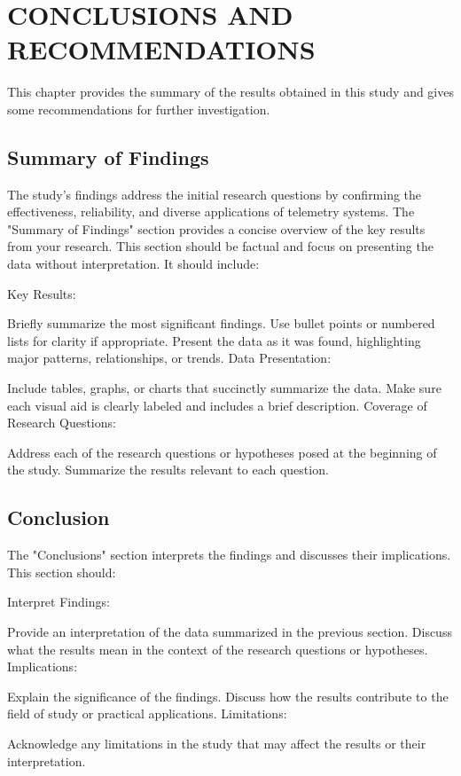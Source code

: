 \chapter{CONCLUSIONS AND RECOMMENDATIONS}
{\baselineskip

This chapter provides the summary of the results obtained in this study and gives some recommendations for further investigation.

\section{Summary of Findings}

The study’s findings address the initial research questions by confirming the effectiveness, reliability, and diverse applications of telemetry systems.
The "Summary of Findings" section provides a concise overview of the key results from your research. This section should be factual and focus on presenting the data without interpretation. It should include:

Key Results:

Briefly summarize the most significant findings.
Use bullet points or numbered lists for clarity if appropriate.
Present the data as it was found, highlighting major patterns, relationships, or trends.
Data Presentation:

Include tables, graphs, or charts that succinctly summarize the data.
Make sure each visual aid is clearly labeled and includes a brief description.
Coverage of Research Questions:

Address each of the research questions or hypotheses posed at the beginning of the study.
Summarize the results relevant to each question.

\section{Conclusion}
The "Conclusions" section interprets the findings and discusses their implications. This section should:

Interpret Findings:

Provide an interpretation of the data summarized in the previous section.
Discuss what the results mean in the context of the research questions or hypotheses.
Implications:

Explain the significance of the findings.
Discuss how the results contribute to the field of study or practical applications.
Limitations:

Acknowledge any limitations in the study that may affect the results or their interpretation.
\newpage
}
